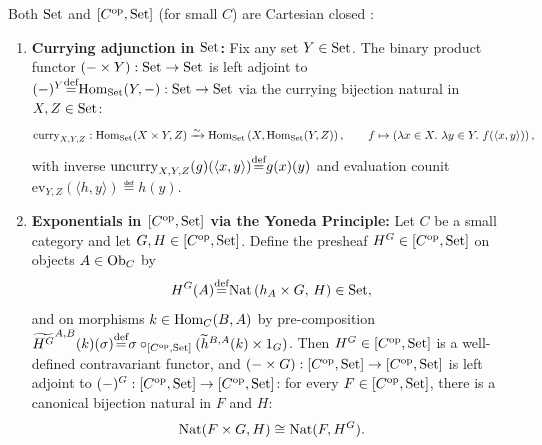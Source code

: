 \documentclass[10pt,a4paper]{article}
\begin{document}
\begin{theorem}\label{thm:cartesian_closed}
Both ${\textrm{Set}}$ and $[C^{\textrm{op}}, {\textrm{Set}}]$ (for small $C$) are Cartesian closed \cite{MacLane1998,Awodey2010,Borceux1994}:
\begin{enumerate}
\item \textbf{Currying adjunction in ${\textrm{Set}}$:} Fix any set $Y \in {\textrm{Set}}$. The binary product functor $(- \times Y) : {\textrm{Set}} \to {\textrm{Set}}$ is left adjoint to $(-)^Y {\stackrel{{\textrm{def}}}{=}} {\textrm{Hom}}_{\textrm{Set}}(Y, -) : {\textrm{Set}} \to {\textrm{Set}}$ via the currying bijection natural in $X, Z \in {\textrm{Set}}$:
$${\mathrm{curry}}_{X,Y,Z} : {\textrm{Hom}}_{\textrm{Set}}(X \times Y, Z) \xrightarrow{\sim} {\textrm{Hom}}_{\textrm{Set}}\left(X, {\textrm{Hom}}_{\textrm{Set}}(Y, Z)\right), \qquad f \mapsto \left(\lambda x \in X.\ \lambda y \in Y.\ f(\langle x, y \rangle)\right),$$
with inverse ${\mathrm{uncurry}}_{X,Y,Z}(g)(\langle x, y \rangle) {\stackrel{{\textrm{def}}}{=}} g(x)(y)$ and evaluation counit $\mathrm{ev}_{Y,Z}(\langle h, y \rangle) \eqdef h(y)$.
\item \textbf{Exponentials in $[C^{\textrm{op}}, {\textrm{Set}}]$ via the Yoneda Principle:} Let $C$ be a small category and let $G, H \in [C^{\textrm{op}}, {\textrm{Set}}]$. Define the presheaf $H^G \in [C^{\textrm{op}}, {\textrm{Set}}]$ on objects $A \in {\textrm{Ob}}_C$ by
$$H^G(A) {\stackrel{{\textrm{def}}}{=}} {\textrm{Nat}}\left(h_A \times G,\, H\right) \in {\textrm{Set}},$$
and on morphisms $k \in {\textrm{Hom}}_C(B, A)$ by pre-composition $\widetilde{H^G}^{A,B}(k)(\sigma) {\stackrel{{\textrm{def}}}{=}} \sigma \circ_{[C^{\textrm{op}},{\textrm{Set}}]} (\widetilde{h}^{B,A}(k) \times 1_G)$. Then $H^G \in [C^{\textrm{op}}, {\textrm{Set}}]$ is a well-defined contravariant functor, and $(- \times G) : [C^{\textrm{op}}, {\textrm{Set}}] \to [C^{\textrm{op}}, {\textrm{Set}}]$ is left adjoint to $(-)^G : [C^{\textrm{op}}, {\textrm{Set}}] \to [C^{\textrm{op}}, {\textrm{Set}}]$: for every $F \in [C^{\textrm{op}}, {\textrm{Set}}]$, there is a canonical bijection natural in $F$ and $H$:
$${\textrm{Nat}}(F \times G, H) \cong {\textrm{Nat}}(F, H^G).$$
\end{enumerate}
\end{theorem}
\myprf
\end{document}
